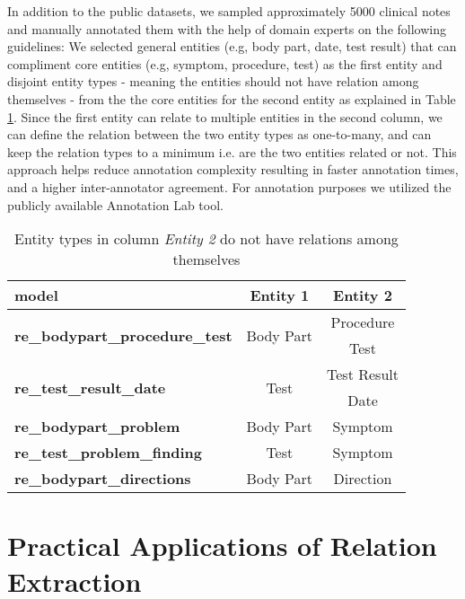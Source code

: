\documentclass[letterpaper]{article}
\begin{document}
In addition to the public datasets, we sampled approximately 5000 clinical notes and manually annotated them with the help of domain experts on the following guidelines: We selected general entities (e.g, body part, date, test result) that can compliment core entities (e.g, symptom, procedure, test) as the first entity and disjoint entity types - meaning the entities should not have relation among themselves - from the the core entities for the second entity as explained in Table \ref{tab:relation_pairs}. Since the first entity can relate to multiple entities in the second column, we can define the relation between the two entity types as one-to-many, and can keep the relation types to a minimum i.e. are the two entities related or not. This approach helps reduce annotation complexity resulting in faster annotation times, and a higher inter-annotator agreement. For annotation purposes we utilized the publicly available Annotation Lab tool.

\begin{table}[ht]
\centering
\begin{tabular}{ lcc}
\toprule
\textbf{model} & \textbf{Entity 1} & \textbf{Entity 2} \\
\midrule

\multirow{2}{*}{\textbf{re\_bodypart\_procedure\_test}} & \multirow{2}{*}{Body Part} & Procedure\\
& & Test\\
\midrule
\multirow{2}{*}{\textbf{re\_test\_result\_date}} & \multirow{2}{*}{Test} & Test Result\\
& & Date\\
\midrule
\textbf{re\_bodypart\_problem} & Body Part & Symptom\\
\midrule
\textbf{re\_test\_problem\_finding} & Test & Symptom\\
\midrule
\textbf{re\_bodypart\_directions} & Body Part & Direction\\


\bottomrule
\end{tabular}
\caption{Entity types in column \textit{Entity 2} do not have relations among themselves}
\label{tab:relation_pairs}
\end{table}










\section{Practical Applications of Relation Extraction}
\end{document}
